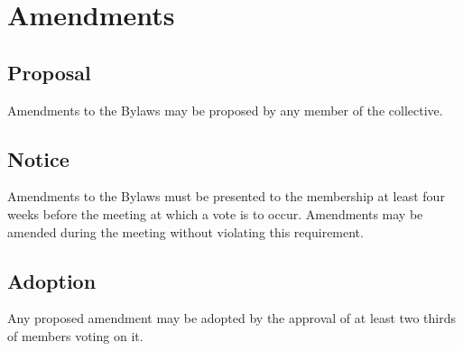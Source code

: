\chapter{Amendments}

\section{Proposal}\label{sec:proposal}
Amendments to the Bylaws may be proposed by any member of the collective.

\section{Notice}\label{sec:notice}
Amendments to the Bylaws must be presented to the membership at least four weeks before the meeting at which a vote is to occur. Amendments may be amended during the meeting without violating this requirement.

\section{Adoption}\label{sec:adoption}
Any proposed amendment may be adopted by the approval of at least two thirds of members voting on it.
